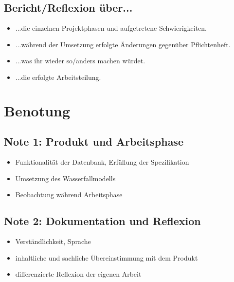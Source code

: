 \subsection{Bericht/Reflexion über...}
\begin{itemize}
    \item ...die einzelnen Projektphasen und aufgetretene Schwierigkeiten.
    \item ...während der Umsetzung erfolgte Änderungen gegenüber Pflichtenheft.
    \item ...was ihr wieder so/anders machen würdet.
    \item ...die erfolgte Arbeitsteilung.
\end{itemize}

\section{Benotung}
\subsection{Note 1: Produkt und Arbeitsphase}
\begin{itemize}
    \item Funktionalität der Datenbank, Erfüllung der Spezifikation
    \item Umsetzung des Wasserfallmodells
    \item Beobachtung während Arbeitsphase
\end{itemize}

\subsection{Note 2: Dokumentation und Reflexion}
\begin{itemize}
    \item Verständlichkeit, Sprache
    \item inhaltliche und sachliche Übereinstimmung mit dem Produkt 
    \item differenzierte Reflexion der eigenen Arbeit
\end{itemize}
